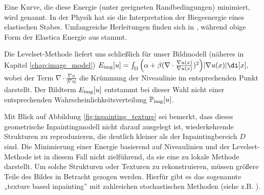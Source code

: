 \documentclass{mythesis}
\begin{document}
Eine Kurve, die diese Energie (unter geeigneten Randbedingungen) minimiert, wird  genannt.
In der Physik hat sie die Interpretation der Biegeenergie eines elastischen Stabes.
Umfangreiche Herleitungen finden sich in \cite{antman2005problems,love1920treatise}, während obige Form der Elastica Energie aus \cite{birkhoff1965nonlinear} stammt.

Die Levelset-Methode liefert uns schließlich für unser Bildmodell (näheres in Kapitel \ref{chap:image_model})
\begin{math}
    \Eimg[u] = \int_{\Omega} \Big(\alpha + \beta (\nabla \cdot \frac{\nabla u(x)}{\nabla u(x)})^2\Big)|\nabla u(x)| \di[x],
\end{math}
wobei der Term $\nabla \cdot \frac{\nabla u}{|\nabla u|}$ die Krümmung der Niveaulinie im entsprechenden Punkt darstellt.
Der Bildterm $\Eimg[u]$ entstammt bei dieser Wahl nicht einer entsprechenden Wahrscheinlichkeitsverteilung $\P_{\mathrm{img}}[u]$.

Mit Blick auf Abbildung \ref{fig:inpainting_texture} sei bemerkt, dass dieses geometrische Inpaintingmodell nicht darauf ausgelegt ist, wiederkehrende Strukturen zu reproduzieren, die deutlich kleiner als der Inpaintingbereich $D$ sind.
Die Minimierung einer Energie basierend auf Niveaulinien und der Levelset-Methode ist in diesem Fall nicht zielführend, da sie eine zu lokale Methode darstellt.
Um solche Strukturen oder Texturen zu rekonstruieren, müssen größere Teile des Bildes in Betracht gezogen werden.
Hierfür gibt es das sogenannte „texture based inpainting” mit zahlreichen stochastischen Methoden (siehe z.B. \cite{criminisi2004region}).
\end{document}
